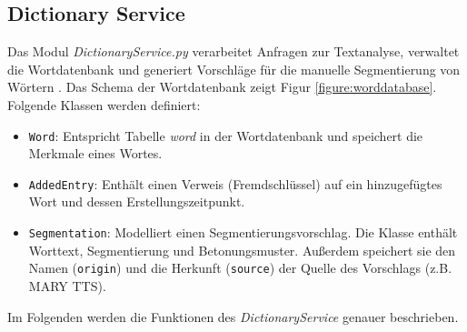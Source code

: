 \subsection{Dictionary Service}

Das Modul \textit{DictionaryService.py} verarbeitet Anfragen zur Textanalyse, verwaltet die Wortdatenbank und generiert Vorschläge für die manuelle Segmentierung von Wörtern . Das Schema der Wortdatenbank zeigt Figur \ref{figure:worddatabase}. Folgende Klassen werden definiert:
\begin{itemize}
	\item \texttt{Word}: Entspricht Tabelle \textit{word} in der Wortdatenbank und speichert die Merkmale eines Wortes.
	\item \texttt{AddedEntry}: Enthält einen Verweis (Fremdschlüssel) auf ein hinzugefügtes Wort und dessen Erstellungszeitpunkt.
	\item \texttt{Segmentation}: Modelliert einen Segmentierungsvorschlag. Die Klasse enthält Worttext, Segmentierung und Betonungsmuster. Außerdem speichert sie den Namen (\texttt{origin}) und die Herkunft (\texttt{source}) der Quelle des Vorschlags (z.B. MARY TTS).
\end{itemize}

Im Folgenden werden die Funktionen des \textit{DictionaryService} genauer beschrieben.

